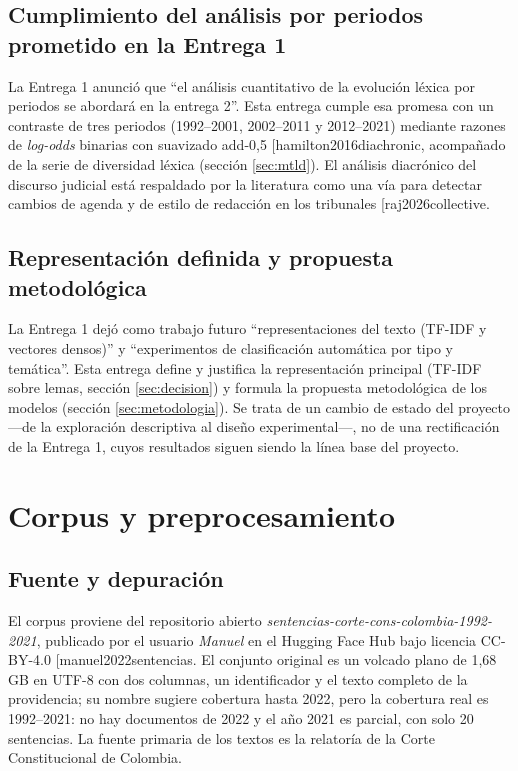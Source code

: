 \documentclass[11pt]{tg_usta}
\makeatletter
\renewcommand{\cite}{\@ifnextchar[{\@tempswatrue\@citex}{\@tempswafalse\@citex[]}}
\makeatother
\begin{document}
\subsection{Cumplimiento del análisis por periodos prometido en la Entrega 1}
La Entrega 1 anunció que ``el análisis cuantitativo de la evolución léxica por periodos se abordará en la entrega 2''. Esta entrega cumple esa promesa con un contraste de tres periodos (1992--2001, 2002--2011 y 2012--2021) mediante razones de \emph{log-odds} binarias con suavizado add-0,5 \cite{hamilton2016diachronic}, acompañado de la serie de diversidad léxica (sección \ref{sec:mtld}). El análisis diacrónico del discurso judicial está respaldado por la literatura como una vía para detectar cambios de agenda y de estilo de redacción en los tribunales \cite{raj2026collective}.

\subsection{Representación definida y propuesta metodológica}
La Entrega 1 dejó como trabajo futuro ``representaciones del texto (TF-IDF y vectores densos)'' y ``experimentos de clasificación automática por tipo y temática''. Esta entrega define y justifica la representación principal (TF-IDF sobre lemas, sección \ref{sec:decision}) y formula la propuesta metodológica de los modelos (sección \ref{sec:metodologia}). Se trata de un cambio de estado del proyecto ---de la exploración descriptiva al diseño experimental---, no de una rectificación de la Entrega 1, cuyos resultados siguen siendo la línea base del proyecto.

\section{Corpus y preprocesamiento}
\label{sec:corpus}

\subsection{Fuente y depuración}
El corpus proviene del repositorio abierto \emph{sentencias-corte-cons-colombia-1992-2021}, publicado por el usuario \emph{Manuel} en el Hugging Face Hub bajo licencia CC-BY-4.0 \cite{manuel2022sentencias}. El conjunto original es un volcado plano de 1,68\,GB en UTF-8 con dos columnas, un identificador y el texto completo de la providencia; su nombre sugiere cobertura hasta 2022, pero la cobertura real es 1992--2021: no hay documentos de 2022 y el año 2021 es parcial, con solo 20 sentencias. La fuente primaria de los textos es la relatoría de la Corte Constitucional de Colombia.
\end{document}
